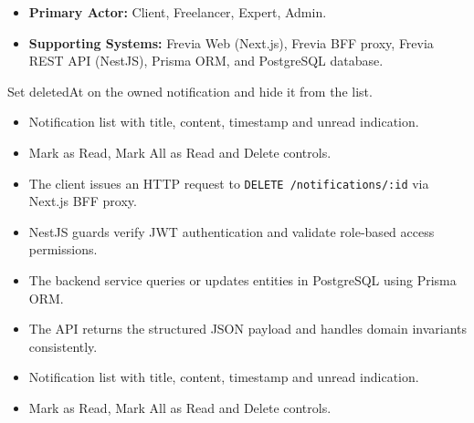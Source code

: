 
\begin{itemize}[leftmargin=1.6em,topsep=3pt,itemsep=2pt,parsep=0pt,label=$\bullet$]
    \item \textbf{Primary Actor:} Client, Freelancer, Expert, Admin.
    \item \textbf{Supporting Systems:} Frevia Web (Next.js), Frevia BFF proxy, Frevia REST API (NestJS), Prisma ORM, and PostgreSQL database.
\end{itemize}

\noindent Set deletedAt on the owned notification and hide it from the list.

\begin{itemize}[leftmargin=1.6em,topsep=3pt,itemsep=2pt,parsep=0pt,label=$\bullet$]
    \item Notification list with title, content, timestamp and unread indication.
    \item Mark as Read, Mark All as Read and Delete controls.
\end{itemize}

\begin{itemize}[leftmargin=1.6em,topsep=3pt,itemsep=2pt,parsep=0pt,label=$\bullet$]
    \item The client issues an HTTP request to \texttt{DELETE /\allowbreak{}notifications/\allowbreak{}:\allowbreak{}id} via Next.js BFF proxy.
    \item NestJS guards verify JWT authentication and validate role-based access permissions.
    \item The backend service queries or updates entities in PostgreSQL using Prisma ORM.
    \item The API returns the structured JSON payload and handles domain invariants consistently.
\end{itemize}

\begin{itemize}[leftmargin=1.6em,topsep=3pt,itemsep=2pt,parsep=0pt,label=$\bullet$]
    \item Notification list with title, content, timestamp and unread indication.
    \item Mark as Read, Mark All as Read and Delete controls.
\end{itemize}

